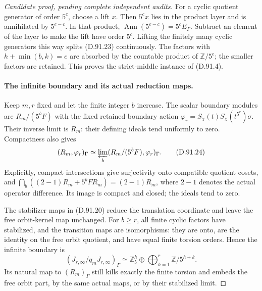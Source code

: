 \begin{proof}[Candidate proof, pending complete independent audits]
For a cyclic quotient generator of order \(5^c\), choose
a lift \(x\). Then \(5^cx\) lies in the product layer
and is annihilated by \(5^{e-c}\). In that product,
\(\operatorname{Ann}(5^{e-c})=5^c E_\Gamma\). Subtract
an element of the layer to make the lift have order
\(5^c\). Lifting the finitely many cyclic generators
this way splits (D.91.23) continuously. The factors with
\(h+\min(b,k)=e\) are absorbed by the countable product
of \(\mathbb Z/5^e\); the smaller factors are retained.
This proves the strict-middle instance of (D.91.4).

\paragraph{The infinite boundary and its actual reduction maps.}
Keep \(m,r\) fixed and let the finite integer \(b\)
increase. The scalar boundary modules are
\(R_m/(5^bF)\) with the fixed retained boundary action
\(\varphi_r=S_\chi(t)S_\chi(t^{5^r})\sigma\). Their
inverse limit is \(R_m\): their defining ideals tend
uniformly to zero. Compactness also gives
\[
  (R_m,\varphi_r)_\Gamma
       \simeq\varprojlim_b(R_m/(5^bF),\varphi_r)_\Gamma.
                                                               \tag{D.91.24}
\]
Explicitly, compact intersections give surjectivity onto
compatible quotient cosets, and
\(\bigcap_b((2-1)R_m+5^bFR_m)=(2-1)R_m\), where
\(2-1\) denotes the actual operator difference. Its
image is compact and closed; the ideals tend to zero.

The stabilizer maps in (D.91.20) reduce the translation
coordinate and leave the free orbit-kernel map unchanged.
For \(b\ge r\), all finite cyclic factors have stabilized,
and the transition maps are isomorphisms: they are onto,
are the identity on the free orbit quotient, and have
equal finite torsion orders. Hence the infinite boundary is
\[
 (J_{r,\infty}/q_mJ_{r,\infty})_\Gamma
       \simeq\mathbb Z_5^h\oplus
                              \bigoplus_{k=1}^r\mathbb Z/5^{h+k}.
                                                               \tag{D.91.25}
\]
Its natural map to \((R_m)_\Gamma\) still kills exactly
the finite torsion and embeds the free orbit part, by
the same actual maps, or by their stabilized limit.


\end{proof}
